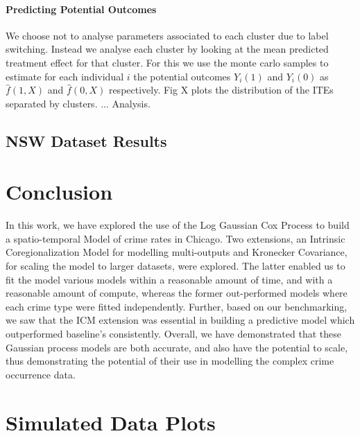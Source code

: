 \documentclass{article}
\begin{document}
\paragraph{Predicting Potential Outcomes} We choose not to analyse parameters associated to each cluster due to label switching. Instead we analyse each cluster by looking at the mean predicted treatment effect for that cluster. For this we use the monte carlo samples to estimate for each individual $i$ the potential outcomes $Y_i(1)$ and $Y_i(0)$ as $\hat{f}(1,X)$ and $\hat{f}(0,X)$ respectively. Fig X plots the distribution of the ITEs separated by clusters. ... Analysis.

\subsection{NSW Dataset Results} 




\section{Conclusion}
In this work, we have explored the use of the Log Gaussian Cox Process to build a spatio-temporal Model of crime rates in Chicago. Two extensions, an Intrinsic Coregionalization Model for modelling multi-outputs and Kronecker Covariance, for scaling the model to larger datasets, were explored. The latter enabled us to fit the model various models within a reasonable amount of time, and with a reasonable amount of compute, whereas the former out-performed models where each crime type were fitted independently. Further, based on our benchmarking, we saw that the ICM extension was essential in building a predictive model which outperformed baseline's consistently. Overall, we have demonstrated that these Gaussian process models are both accurate, and also have the potential to scale, thus demonstrating the potential of their use in modelling the complex crime occurrence data. 




\appendix

\section{Simulated Data Plots}
\end{document}
